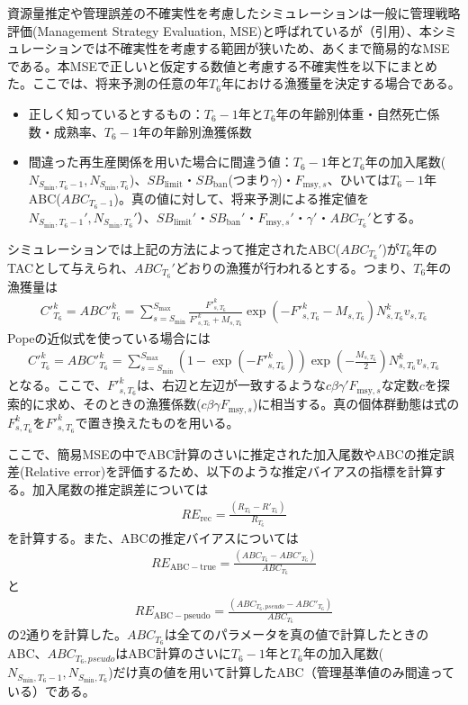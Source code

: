 \documentclass[11pt]{jsarticle}
\begin{document}
資源量推定や管理誤差の不確実性を考慮したシミュレーションは一般に管理戦略評価(Management Strategy Evaluation, MSE)と呼ばれているが（引用）、本シミュレーションでは不確実性を考慮する範囲が狭いため、あくまで簡易的なMSEである。本MSEで正しいと仮定する数値と考慮する不確実性を以下にまとめた。ここでは、将来予測の任意の年$T_6$年における漁獲量を決定する場合である。
\begin{itemize}
\item 正しく知っているとするもの：$T_6-1$年と$T_6$年の年齢別体重・自然死亡係数・成熟率、$T_6-1$年の年齢別漁獲係数
\item 間違った再生産関係を用いた場合に間違う値：$T_6-1$年と$T_6$年の加入尾数($N_{S_{\mathrm{min}},T_6 -1}, N_{S_{\mathrm{min}},T_6}$)、$S\!B_{\mathrm{limit}}$・$S\!B_{\mathrm{ban}}$(つまり$\gamma$)・$F_{\mathrm{msy},s}$、ひいては$T_6-1$年ABC($ABC_{T_6-1}$)。真の値に対して、将来予測による推定値を$N_{S_{\mathrm{min}},T_6-1}', N_{S_{\mathrm{min}},T_6}'$）、$S\!B_{\mathrm{limit}}'$・$S\!B_{\mathrm{ban}}'$・$F_{\mathrm{msy},s}'$・$\gamma'$・$ABC_{T_6}'$とする。
\end{itemize}

シミュレーションでは上記の方法によって推定されたABC($ABC_{T_6}'$)が$T_6$年のTACとして与えられ、$ABC_{T_6}'$どおりの漁獲が行われるとする。つまり、$T_6$年の漁獲量は
\begin{eqnarray}
  {C'}_{T_6}^{k}={ABC'}_{T_6}^{k}=\sum_{s=S_{\mathrm{min}}}^{S_{\mathrm{max}}} \frac{{F'}_{s,T_6}^k}{{F'}_{s,T_6}^k+M_{s,T_6}}
  \exp(- {F'}_{s,T_6}^k - M_{s,T_6}) N_{s,T_6}^k v_{s,T_6}
\label{ABC_eq1}
\end{eqnarray}
Popeの近似式を使っている場合には
\begin{eqnarray}
  {C'}_{T_6}^k={ABC'}_{T_6}^{k}=\sum_{s=S_{\mathrm{min}}}^{S_{\mathrm{max}}} (1-\exp(- {F'}_{s,T_6}^k)) \exp(-\frac{M_{s,T_6}}{2}) N_{s,T_6}^k v_{s,T_6}
\label{ABC_eq2}
\end{eqnarray}
となる。ここで、${F'}_{s,T_6}^k$は、右辺と左辺が一致するような$c \beta \gamma' F_{\mathrm{msy},s}$な定数$c$を探索的に求め、そのときの漁獲係数($c \beta \gamma F_{\mathrm{msy},s}$)に相当する。真の個体群動態は式\label{future_eq3}の$F_{s,T_6}^k$を${F'}_{s,T_6}^k$で置き換えたものを用いる。

ここで、簡易MSEの中でABC計算のさいに推定された加入尾数やABCの推定誤差(Relative error)を評価するため、以下のような推定バイアスの指標を計算する。加入尾数の推定誤差については
\begin{eqnarray}
  R\!E_{\mathrm{rec}} = \frac{(R_{T_6}-R'_{T_6})}{R_{T_6}}
\label{RE1}
\end{eqnarray}
を計算する。また、ABCの推定バイアスについては
\begin{eqnarray}
  R\!E_{\mathrm{ABC-true}} = \frac{(ABC_{T_6}-ABC'_{T_6})}{ABC_{T_6}}
\label{ABC_eq1}
\end{eqnarray}
と
\begin{eqnarray}
  R\!E_{\mathrm{ABC-pseudo}} = \frac{(ABC_{T_6, pseudo}-ABC'_{T_6})}{ABC_{T_6}}
\label{ABC_eq2}
\end{eqnarray}
の2通りを計算した。$ABC_{T_6}$は全てのパラメータを真の値で計算したときのABC、$ABC_{T_6, pseudo}$はABC計算のさいに$T_6-1$年と$T_6$年の加入尾数($N_{S_{\mathrm{min}},T_6 -1}, N_{S_{\mathrm{min}},T_6}$)だけ真の値を用いて計算したABC（管理基準値のみ間違っている）である。
\end{document}
